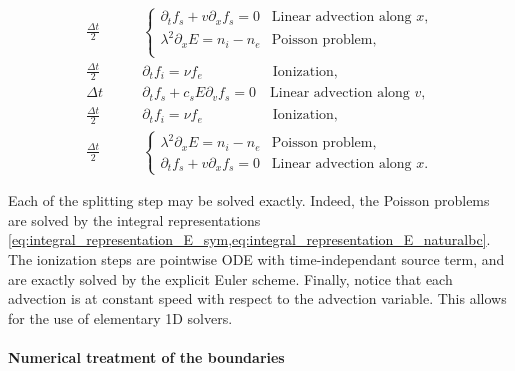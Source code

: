 \documentclass{article}
\numberwithin{equation}{section}
\newcommand{\todo}[1]{{\color{red}\textbf{#1}}}
\begin{document}
\begin{align*}
	\frac{\Delta t}{2} \quad\quad&
	\begin{cases}
		\partial_t f_s + v \partial_x f_s = 0 & \text{Linear advection along $x$,} \\
		\lambda^2 \partial_x E = n_i - n_e & \text{Poisson problem,} \\
	\end{cases} \\
	\frac{\Delta t}{2} \quad\quad&
	\partial_t f_i = \nu f_e \quad\quad\quad\quad\quad \text{Ionization,} \\
	\Delta t \quad\quad&
	\partial_t f_s + c_s E \partial_v f_s = 0 \quad \text{Linear advection along $v$,} \\
	\frac{\Delta t}{2} \quad\quad&
	\partial_t f_i = \nu f_e \quad\quad\quad\quad\quad \text{Ionization,} \\
	\frac{\Delta t}{2} \quad\quad&
	\begin{cases}
		\lambda^2 \partial_x E = n_i - n_e & \text{Poisson problem,}\\
		\partial_t f_s + v \partial_x f_s = 0 & \text{Linear advection along $x$.}
	\end{cases} 
\end{align*}

Each of the splitting step may be solved exactly. Indeed, the Poisson problems are solved by the integral representations \cref{eq:integral_representation_E_sym,eq:integral_representation_E_naturalbc}. The ionization steps are pointwise ODE with time-independant source term, and are exactly solved by the explicit Euler scheme. Finally, notice that each advection is at constant speed with respect to the advection variable. This allows for the use of elementary 1D solvers. 



\paragraph{Numerical treatment of the boundaries}
\end{document}
